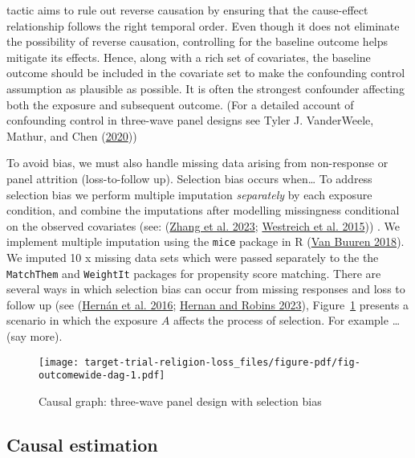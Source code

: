 \documentclass[
  singlecolumn]{report}
\begin{document}
\begin{enumerate}
  tactic aims to rule out reverse causation by ensuring that the
  cause-effect relationship follows the right temporal order. Even
  though it does not eliminate the possibility of reverse causation,
  controlling for the baseline outcome helps mitigate its effects.
  Hence, along with a rich set of covariates, the baseline outcome
  should be included in the covariate set to make the confounding
  control assumption as plausible as possible. It is often the strongest
  confounder affecting both the exposure and subsequent outcome. (For a
  detailed account of confounding control in three-wave panel designs
  see Tyler J. VanderWeele, Mathur, and Chen
  (\protect\hyperlink{ref-vanderweele2020}{2020}))
\end{enumerate}

To avoid bias, we must also handle missing data arising from
non-response or panel attrition (loss-to-follow up). Selection bias
occurs when\ldots{} To address selection bias we perform multiple
imputation \emph{separately} by each exposure condition, and combine the
imputations after modelling missingness conditional on the observed
covariates (see: (\protect\hyperlink{ref-zhang2023}{Zhang et al. 2023};
\protect\hyperlink{ref-westreich2015}{Westreich et al. 2015})) . We
implement multiple imputation using the \texttt{mice} package in R
(\protect\hyperlink{ref-vanbuuren2018}{Van Buuren 2018}). We imputed 10
x missing data sets which were passed separately to the the
\texttt{MatchThem} and \texttt{WeightIt} packages for propensity score
matching. There are several ways in which selection bias can occur from
missing responses and loss to follow up (see
(\protect\hyperlink{ref-hernuxe1n2016}{Hernán et al. 2016};
\protect\hyperlink{ref-hernan2023}{Hernan and Robins 2023}),
Figure~\ref{fig-outcomewide-dag} presents a scenario in which the
exposure \(A\) affects the process of selection. For example \ldots{}
(say more).

\begin{figure}

{\centering \texttt{[image: target-trial-religion-loss\_files/figure-pdf/fig-outcomewide-dag-1.pdf]}

}

\caption{\label{fig-outcomewide-dag}Causal graph: three-wave panel
design with selection bias}

\end{figure}

\hypertarget{causal-estimation}{%
\subsection{Causal estimation}\label{causal-estimation}}
\end{document}
